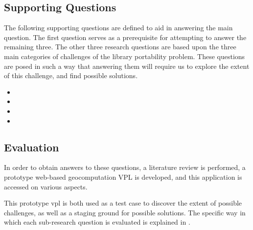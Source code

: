 \subsection*{Supporting Questions}
The following supporting questions are defined to aid in answering the main question.
The first question serves as a prerequisite for attempting to answer the remaining three. 
The other three research questions are based upon the three main categories of challenges of the library portability problem.  
These questions are posed in such a way that answering them will require us to explore the extent of this challenge, and find possible solutions.


\begin{itemize}[-]
  \item \mySubRQOne
  \item \mySubRQTwo
  \item \mySubRQThree
  \item \mySubRQFour
\end{itemize}

\subsection*{Evaluation}
In order to obtain answers to these questions, a literature review is performed,
a prototype web-based geocomputation VPL is developed, 
and this application is accessed on various aspects.

This prototype vpl is both used as a test case to discover the extent of possible challenges, as well as a staging ground for possible solutions. 
The specific way in which each sub-research question is evaluated is explained in .




